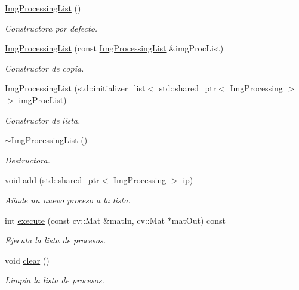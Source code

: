 \begin{DoxyCompactItemize}
\item 
\hyperlink{class_i3_d_1_1_img_processing_list_a458a291aa59116d01b89ace62e53d5e3}{Img\+Processing\+List} ()
\begin{DoxyCompactList}\small\item\em Constructora por defecto. \end{DoxyCompactList}\item 
\hyperlink{class_i3_d_1_1_img_processing_list_a72a579b6cac5bc173b882af45b7f052d}{Img\+Processing\+List} (const \hyperlink{class_i3_d_1_1_img_processing_list}{Img\+Processing\+List} \&img\+Proc\+List)
\begin{DoxyCompactList}\small\item\em Constructor de copia. \end{DoxyCompactList}\item 
\hyperlink{class_i3_d_1_1_img_processing_list_a129fcd23d97ed0c2773e97032123cb05}{Img\+Processing\+List} (std\+::initializer\+\_\+list$<$ std\+::shared\+\_\+ptr$<$ \hyperlink{class_i3_d_1_1_img_processing}{Img\+Processing} $>$$>$ img\+Proc\+List)
\begin{DoxyCompactList}\small\item\em Constructor de lista. \end{DoxyCompactList}\item 
\hyperlink{class_i3_d_1_1_img_processing_list_a7c0dc2793b201e13ee1408943bb2daa6}{$\sim$\+Img\+Processing\+List} ()
\begin{DoxyCompactList}\small\item\em Destructora. \end{DoxyCompactList}\item 
void \hyperlink{class_i3_d_1_1_img_processing_list_af0b371a633fa2c3ab77b2100e24c40ac}{add} (std\+::shared\+\_\+ptr$<$ \hyperlink{class_i3_d_1_1_img_processing}{Img\+Processing} $>$ ip)
\begin{DoxyCompactList}\small\item\em Añade un nuevo proceso a la lista. \end{DoxyCompactList}\item 
int \hyperlink{class_i3_d_1_1_img_processing_list_a4b48e25f5b7771fbdf2512c219cba4f9}{execute} (const cv\+::\+Mat \&mat\+In, cv\+::\+Mat $\ast$mat\+Out) const 
\begin{DoxyCompactList}\small\item\em Ejecuta la lista de procesos. \end{DoxyCompactList}\item 
void \hyperlink{class_i3_d_1_1_img_processing_list_a2e77f8af26c4e10ddd9d4fc2543d69e6}{clear} ()
\begin{DoxyCompactList}\small\item\em Limpia la lista de procesos. \end{DoxyCompactList}\end{DoxyCompactItemize}



